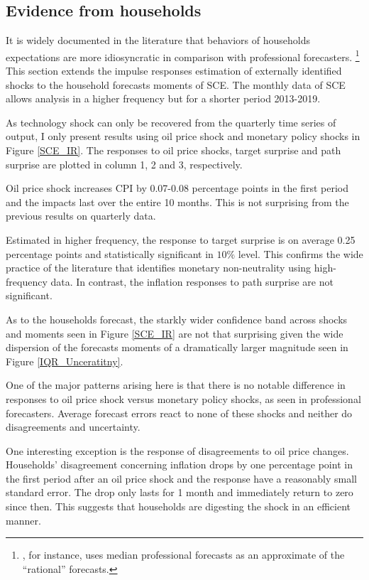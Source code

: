 \documentclass[12pt]{article}
\begin{document}
	\subsection{Evidence from households}
	
	It is widely documented in the literature that behaviors of households expectations are more idiosyncratic in comparison with professional forecasters. \footnote{\cite{carroll2003macroeconomic}, for instance, uses median professional forecasts as an approximate of the ``rational'' forecasts.} This section extends the impulse responses estimation of externally identified shocks to the household forecasts moments of SCE.  The monthly data of SCE allows analysis in a higher frequency but for a shorter period 2013-2019. 
	
	As technology shock can only be recovered from the quarterly time series of output, I only present results using oil price shock and monetary policy shocks in Figure \ref{SCE_IR}. The responses to oil price shocks, target surprise and path surprise are plotted in column 1, 2 and 3, respectively. 
	
	Oil price shock increases CPI by 0.07-0.08 percentage points in the first period and the impacts last over the entire 10 months. This is not surprising from the previous results on quarterly data. 
	
	Estimated in higher frequency, the response to target surprise is on average 0.25 percentage points and statistically significant in $10\%$ level. This confirms the wide practice of the literature that identifies monetary non-neutrality using high-frequency data. In contrast, the inflation responses to path surprise are not significant. 
	
	As to the households forecast, the starkly wider confidence band across shocks and moments seen in Figure \ref{SCE_IR} are not that surprising given the wide dispersion of the forecasts moments of a dramatically larger magnitude seen in Figure \ref{IQR_Unceratitny}.  
	
	One of the major patterns arising here is that there is no notable difference in responses to oil price shock versus monetary policy shocks, as seen in professional forecasters.  Average forecast errors react to none of these shocks and neither do disagreements and uncertainty.  
	
	One interesting exception is the response of disagreements to oil price changes. Households' disagreement concerning inflation drops by one percentage point in the first period after an oil price shock and the response have a reasonably small standard error. The drop only lasts for 1 month and immediately return to zero since then. This suggests that households are digesting the shock in an efficient manner.  
	
\end{document}
